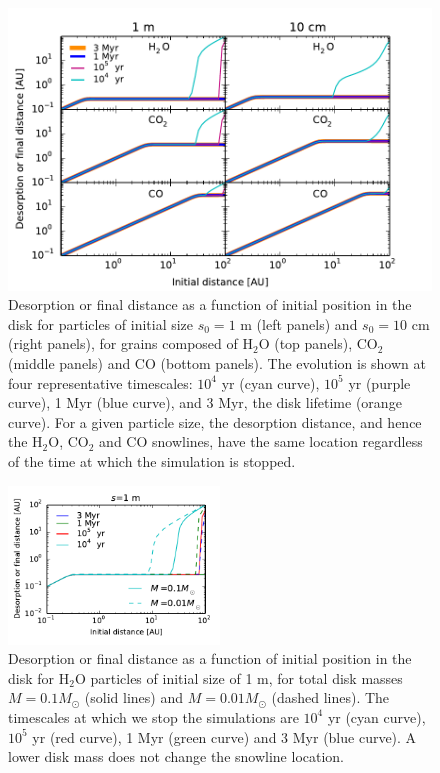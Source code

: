 \documentclass[apj]{emulateapj}
\begin{document}
\begin{figure}[t!]
\centering
\includegraphics[width=\textwidth]{time_plots.pdf}
\caption{Desorption or final distance as a function of initial position in the disk for particles of initial size $s_0=1$ m (left panels) and $s_0=10$ cm (right panels), for grains composed of H$_2$O (top panels), CO$_2$ (middle panels) and CO (bottom panels). The evolution is shown at four representative timescales: $10^4$ yr (cyan curve), $10^5$ yr (purple curve), 1 Myr (blue curve), and 3 Myr, the disk lifetime (orange curve). For a given particle size, the desorption distance, and hence the H$_2$O, CO$_2$ and CO snowlines, have the same location regardless of the time at which the simulation is stopped.}
\label{fig:timeplots}
\end{figure}

\begin{figure}[h!]
\centering
\includegraphics[width=0.5\textwidth]{desorption_distance_varying_Md.pdf}
\caption{Desorption or final distance as a function of initial position in the disk for H$_2$O particles of initial size of 1 m, for total disk masses $M=0.1 M_{\odot}$ (solid lines) and $M=0.01 M_{\odot}$ (dashed lines). The timescales at which we stop the simulations are $10^4$ yr (cyan curve), $10^5$ yr (red curve), 1 Myr (green curve) and 3 Myr (blue curve). A lower disk mass does not change the snowline location.}
\label{fig:varMd}
\end{figure}
\end{document}
